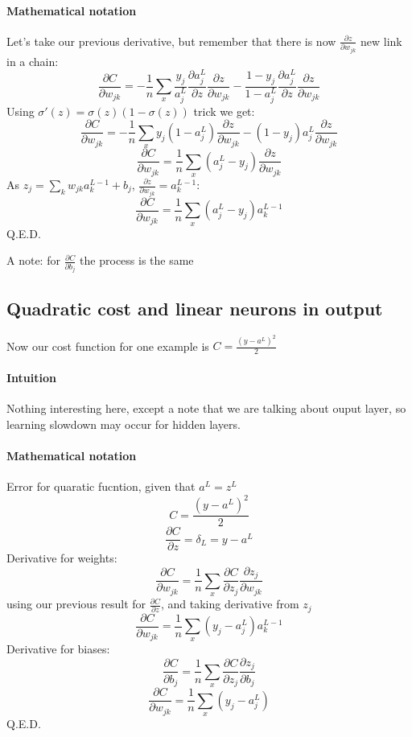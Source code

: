 \documentclass{article}
\begin{document}
\paragraph{Mathematical notation}
Let's take our previous derivative, but remember that there is now $\frac{\partial z}{\partial w_{jk}}$ new link in a chain:
$$\frac{\partial C}{\partial w_{jk}} = -\frac{1}{n} \sum_x \frac{y_j}{a^L_j} \frac{\partial a^L_j}{\partial z} \frac{\partial z}{\partial w_{jk}} - \frac{1-y_j}{1-a^L_j} \frac{\partial a^L_j}{\partial z} \frac{\partial z}{\partial w_{jk}}$$
Using $\sigma'(z) = \sigma(z)(1 - \sigma(z))$ trick we get:
$$\frac{\partial C}{\partial w_{jk}} = -\frac{1}{n} \sum_x y_j(1 - a^L_j) \frac{\partial z}{\partial w_{jk}} - (1-y_j)a^L_j \frac{\partial z}{\partial w_{jk}}$$
$$\frac{\partial C}{\partial w_{jk}} = \frac{1}{n} \sum_x (a^L_j - y_j) \frac{\partial z}{\partial w_{jk}}$$
As $z_j = \sum_k w_{jk} a^{L-1}_k + b_j$, $\frac{\partial z}{\partial w_{jk}} = a^{L-1}_{k}$:
$$\frac{\partial C}{\partial w_{jk}} = \frac{1}{n} \sum_x (a^L_j - y_j) a^{L-1}_{k}$$
Q.E.D.

A note: for $\frac{\partial C}{\partial b_{j}}$ the process is the same

\subsection{Quadratic cost and linear neurons in output}
Now our cost function for one example is $C = \frac{(y-a^L)^2}{2}$
\paragraph{Intuition}
Nothing interesting here, except a note that we are talking about ouput layer, so learning slowdown may occur for hidden layers.
\paragraph{Mathematical notation}
Error for quaratic fucntion, given that $a^L = z^L$
$$C = \frac{(y-a^L)^2}{2}$$
$$ \frac{\partial C}{\partial z} = \delta_L = y - a^L$$
Derivative for weights:
$$ \frac{\partial C}{\partial w_{jk}} = \frac{1}{n} \sum_x \frac{\partial C}{\partial z_j} \frac{\partial z_j}{\partial w_{jk}}$$
using our previous result for $ \frac{\partial C}{\partial z}$, and taking derivative from $z_j$
$$ \frac{\partial C}{\partial w_{jk}} = \frac{1}{n} \sum_x (y_j - a^L_j) a^{L-1}_k$$
Derivative for biases:
$$ \frac{\partial C}{\partial b_{j}} = \frac{1}{n} \sum_x \frac{\partial C}{\partial z_j} \frac{\partial z_j}{\partial b_{j}}$$
$$ \frac{\partial C}{\partial w_{jk}} = \frac{1}{n} \sum_x (y_j - a^L_j)$$
Q.E.D.
\end{document}

